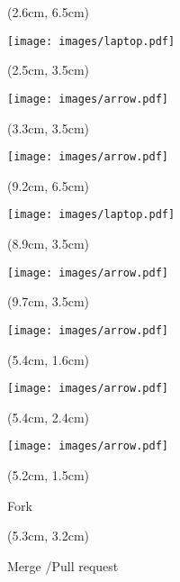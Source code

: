\documentclass[aspectratio=169]{beamer}
\begin{document}
\begin{frame}{}
  \begin{textblock*}{5cm}(2.6cm, 6.5cm)
    \begin{center}
      \texttt{[image: images/laptop.pdf]}
    \end{center}
  \end{textblock*}  

  \begin{textblock*}{5cm}(2.5cm, 3.5cm)
    \begin{center}
      \texttt{[image: images/arrow.pdf]}
    \end{center}
  \end{textblock*}

  \begin{textblock*}{5cm}(3.3cm, 3.5cm)
    \begin{center}
      \texttt{[image: images/arrow.pdf]}
    \end{center}
  \end{textblock*}      

  \begin{textblock*}{5cm}(9.2cm, 6.5cm)
    \begin{center}
      \texttt{[image: images/laptop.pdf]}
    \end{center}
  \end{textblock*}

  \begin{textblock*}{5cm}(8.9cm, 3.5cm)
    \begin{center}
      \texttt{[image: images/arrow.pdf]}
    \end{center}
  \end{textblock*}
  \begin{textblock*}{5cm}(9.7cm, 3.5cm)
    \begin{center}
      \texttt{[image: images/arrow.pdf]}
    \end{center}
  \end{textblock*}
  
  \begin{textblock*}{5cm}(5.4cm, 1.6cm)
    \begin{center}
      \texttt{[image: images/arrow.pdf]}
    \end{center}
  \end{textblock*}
  \begin{textblock*}{5cm}(5.4cm, 2.4cm)
    \begin{center}
      \texttt{[image: images/arrow.pdf]}
    \end{center}
  \end{textblock*}  
  
  \begin{textblock*}{5cm}(5.2cm, 1.5cm)
    \begin{center}
      {\small Fork}
    \end{center}
  \end{textblock*}
  
  \begin{textblock*}{5cm}(5.3cm, 3.2cm)
    \begin{center}
      {\small Merge /Pull request}
    \end{center}
  \end{textblock*}    
  
\end{frame}
\end{document}
